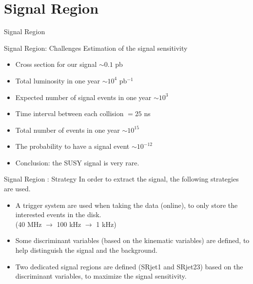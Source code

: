 \documentclass[mathserif,serif]{beamer}
\begin{document}
\section{Signal Region}
\begin{frame}
\begin{center}
\huge
Signal Region
\end{center}
\end{frame}

\begin{frame}{Signal Region: Challenges}
Estimation of the signal sensitivity
\begin{itemize}
\item Cross section for our signal $\sim 0.1$ pb
\item Total luminosity in one year $\sim 10^4$ pb$^{-1}$
\item Expected number of signal events in one year $\sim 10^3$
\end{itemize}
\begin{itemize}
\item Time interval between each collision $= 25$ ns
\item Total number of events in one year $\sim 10^{15}$
\item The probability to have a signal event $\sim 10^{-12}$
\item Conclusion: the SUSY signal is very rare.
\end{itemize}
\end{frame}

\begin{frame}{Signal Region : Strategy}
In order to extract the signal, the following strategies are used.
\begin{itemize}
\item A trigger system are used when taking the data (online), to only store the interested events in the disk. \\
(40 MHz $\rightarrow$ 100 kHz $\rightarrow$ 1 kHz)
\item Some discriminant variables (based on the kinematic variables) are defined, to help distinguish the signal and the background.
\item Two dedicated signal regions are defined (SRjet1 and SRjet23) based on the discriminant variables, to maximize the signal sensitivity.
\end{itemize}
\end{frame}
\end{document}
